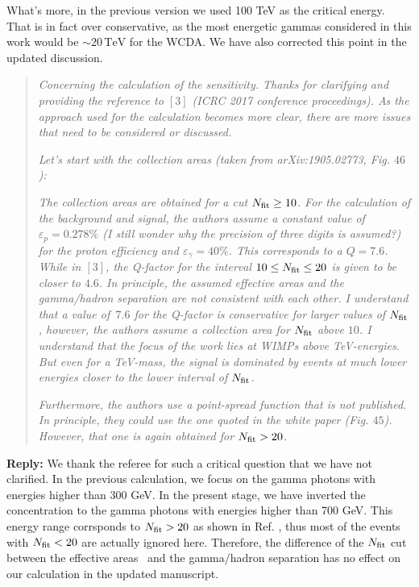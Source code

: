 \documentclass{article}
\def\TeV{\mathrm{TeV}} %
\begin{document}
What's more, in the previous version we used 100 TeV as the critical energy.
That is in fact over conservative, as the most energetic gammas considered in this work would be $\sim20\,\TeV$ for the WCDA.
We have also corrected this point in the updated discussion.

\begin{quote}
\emph{Concerning the calculation of the sensitivity. Thanks for clarifying and providing the reference to $[3]$ (ICRC 2017 conference proceedings). As the approach used for the calculation becomes more clear, there are more issues that need to be considered or discussed.}

\emph{Let’s start with the collection areas (taken from arXiv:1905.02773, Fig. $46$):}

\emph{The collection areas are obtained for a cut $N_{\rm fit} \geq 10$. For the calculation of the background and signal, the authors assume a constant value of $\varepsilon_{p} = 0.278\%$ (I still wonder why the precision of three digits is assumed?) for the proton efficiency and $\varepsilon_{\gamma} = 40\%$. This corresponds to a $Q = 7.6$. While in $[3]$, the Q-factor for the interval $10 \leq N_{\rm fit} \leq 20$ is given to be closer to $4.6$. In principle, the assumed effective areas and the gamma/hadron separation are not consistent with each other. I understand that a value of \,$7.6$ for the Q-factor is conservative for larger values of $N_{\rm fit}$ , however, the authors assume a collection area for $N_{\rm fit}$ above $10$. I understand that the focus of the work lies at WIMPs above TeV-energies. But even for a TeV-mass, the signal is dominated by events at much lower energies closer to the lower interval of $N_{\rm fit}$.}

\emph{Furthermore, the authors use a point-spread function that is not published. In principle, they could use the one quoted in the white paper (Fig. $45$). However, that one is again obtained for $N_{\rm fit} > 20$.}
\end{quote}

\textbf{Reply:} We thank the referee for such a critical question that we have not clarified.
In the previous calculation, we focus on the gamma photons with energies higher than 300 GeV.
In the present stage, we have inverted the concentration to the gamma photons with energies higher than 700 GeV.
This energy range corrsponds to $N_{\rm fit} > 20$ as shown in Ref. \cite{Zha:2017vcs}, thus most of the events with $N_{\rm fit} < 20$ are actually ignored here.
Therefore, the difference of the $N_{\rm fit}$ cut between the effective areas~\cite{Bai:2019khm} and the gamma/hadron separation has no effect on our calculation in the updated manuscript.
\end{document}
